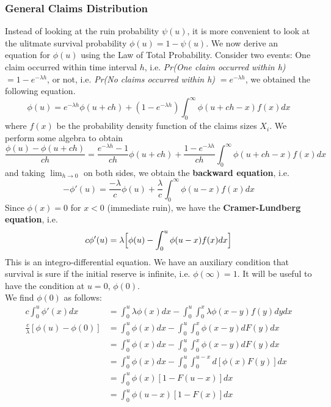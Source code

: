 \documentclass[12pt]{article}
\begin{document}
\subsubsection{General Claims Distribution}
Instead of looking at the ruin probability \(\psi(u)\), it is more convenient to look at the 
ulitmate survival probability \(\phi(u)=1-\psi(u)\).
We now derive an equation for $\phi(u)$ using the Law of Total Probability.
Consider two events: One claim occurred within time interval \(h\), i.e. \textit{Pr(One claim occurred within h) }\(=1-e^{-\lambda h}\), or not, i.e. \textit{Pr(No claims occurred within h) }\(=e^{-\lambda h}\), we obtained the following equation. 
\begin{equation*}
    \phi(u)=e^{-\lambda h}\phi(u+ch)+(1-e^{-\lambda h})\int_{0}^{\infty}\phi(u+ch-x)f(x)dx
\end{equation*}
where \(f(x)\) be the probability density function of 
the claims sizes \(X_i\).  We perform some algebra to obtain
\begin{equation*}
    \frac{\phi(u)-\phi(u+ch)}{ch}=\frac{e^{-\lambda h}-1}{ch}\phi(u+ch)+\frac{1-e^{-\lambda h}}{ch}\int_{0}^{\infty}\phi(u+ch-x)f(x)dx
\end{equation*}
and taking $\displaystyle\lim_{h\to 0}$ on both sides, we obtain the \textbf{backward equation}, i.e.
\begin{equation}
    -\phi'(u)=\frac{-\lambda}{c}\phi(u)+\frac{\lambda}{c}\int_{0}^{\infty}\phi(u-x)f(x)dx
\end{equation}
Since \(\phi(x)=0\) for \(x<0\) (immediate ruin), we have the \textbf{Cramer-Lundberg equation}, i.e.
\begin{equation}\label{CL-eq}
    c\phi'(u)=\lambda\Big[\phi(u)-\int_{0}^{u}\phi(u-x)f(x)dx\Big]\\
\end{equation}
This is an integro-differential equation.  We have an auxiliary condition
that survival is sure if the initial reserve is infinite, i.e. 
\(\phi(\infty)=1\).   It will be useful to 
have the condition at $u=0$,  \(\phi(0)\). \\
We find \(\phi(0)\) as follows:
\begin{align*}
    c\int_{0}^{u}\phi'(x)dx &=\int_{0}^{u}\lambda\phi(x)dx-\int_{0}^{u}\int_{0}^{x}\lambda\phi(x-y)f(y)dydx\\
    \frac{c}{\lambda}[\phi(u)-\phi(0)]&=\int_{0}^{u}\phi(x)dx-\int_{0}^{u}\int_{0}^{x}\phi(x-y)dF(y)dx\\
    &=\int_{0}^{u}\phi(x)dx-\int_{0}^{u}\int_{0}^{x}\phi(x-y)dF(y)dx\\
    &=\int_{0}^{u}\phi(x)dx-\int_{0}^{u}\int_{0}^{u-x}d[\phi(x)F(y)]dx\\
    &=\int_{0}^{u}\phi(x)[1-F(u-x)]dx\\
    &=\int_{0}^{u}\phi(u-x)[1-F(x)]dx\\
\end{align*}
\end{document}
